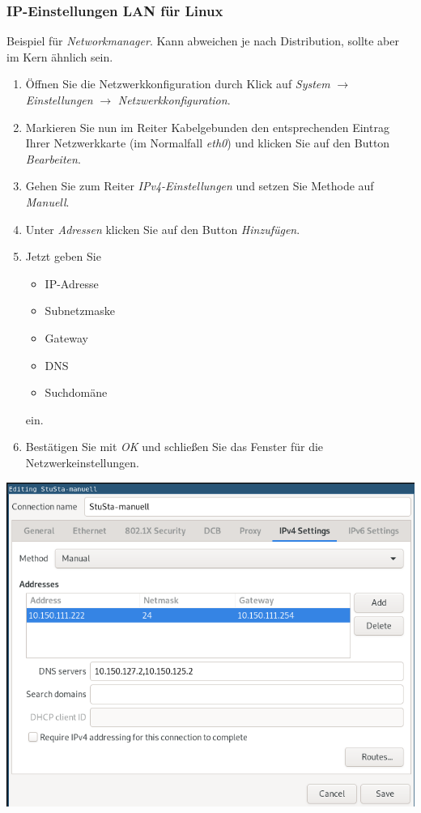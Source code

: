 \documentclass[a4paper,12pt]{scrartcl}
\begin{document}
\subsubsection*{IP-Einstellungen LAN für Linux}

Beispiel für \textit{Networkmanager}.
Kann abweichen je nach Distribution, sollte aber im Kern ähnlich sein.

\begin{minipage}{0.57\textwidth}
\begin{enumerate}
	\item Öffnen Sie die Netzwerkkonfiguration durch Klick auf \emph{System} $\rightarrow$ \emph{Einstellungen} $\rightarrow$ \emph{Netzwerkkonfiguration}.
	\item Markieren Sie nun im Reiter Kabelgebunden den entsprechenden Eintrag Ihrer Netzwerkkarte (im Normalfall \emph{eth0}) und klicken Sie auf den Button \emph{Bearbeiten}.
	\item Gehen Sie zum Reiter \emph{IPv4-Einstellungen} und setzen Sie Methode auf \emph{Manuell}.
	\item Unter \emph{Adressen} klicken Sie auf den Button \emph{Hinzufügen}.
	\item Jetzt geben Sie
	\begin{itemize}
		\item IP-Adresse
		\item Subnetzmaske
		\item Gateway
		\item DNS
		\item Suchdomäne
	\end{itemize}
	ein.
	\item Bestätigen Sie mit \emph{OK} und schließen Sie das Fenster für die Netzwerkeinstellungen.
\end{enumerate}
\end{minipage}
\hfill
\begin{minipage}{0.4\textwidth}
\includegraphics[width=\linewidth]{Bilder/IP_Ubuntu_neu}
\end{minipage}
\end{document}
